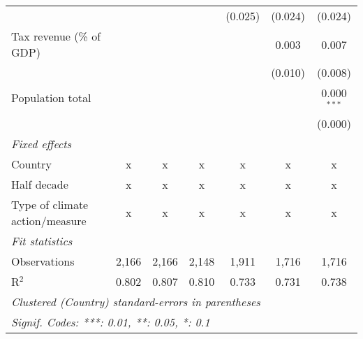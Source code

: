 \begin{tabular}{lcccccc}
                                                     &         &                &                & (0.025)        & (0.024)        & (0.024)\\   
   Tax revenue (\% of GDP)                           &         &                &                &                & 0.003          & 0.007\\   
                                                     &         &                &                &                & (0.010)        & (0.008)\\   
   Population total                                  &         &                &                &                &                & 0.000$^{***}$\\   
                                                     &         &                &                &                &                & (0.000)\\   
   \emph{Fixed effects}\\
   Country                                           & x       & x              & x              & x              & x              & x\\  
   Half decade                                       & x       & x              & x              & x              & x              & x\\  
   Type of climate action/measure                    & x       & x              & x              & x              & x              & x\\  
   \midrule \emph{Fit statistics}\\
   Observations                                      & 2,166   & 2,166          & 2,148          & 1,911          & 1,716          & 1,716\\  
   R$^2$                                             & 0.802   & 0.807          & 0.810          & 0.733          & 0.731          & 0.738\\  
   \midrule
   \multicolumn{7}{l}{\emph{Clustered (Country) standard-errors in parentheses}}\\
   \multicolumn{7}{l}{\emph{Signif. Codes: ***: 0.01, **: 0.05, *: 0.1}}\\
\end{tabular}
\par\endgroup


